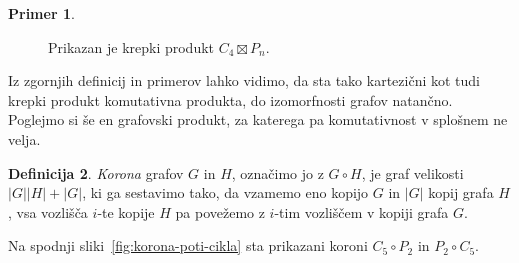 \documentclass[12pt,a4paper,twoside]{article}
\theoremstyle{definition} %
\newtheorem{definicija}{Definicija}[section]
\newtheorem{primer}[definicija]{Primer}
\theoremstyle{plain} %
\numberwithin{equation}{section}  %
\begin{document}
\begin{primer}
\begin{figure}[h]
        \caption{Prikazan je krepki produkt $C_4 \boxtimes P_n$.}
        \label{fig:krep-produkt-cikel-pot}
    \end{figure}
\end{primer}

Iz zgornjih definicij in primerov lahko vidimo, da sta tako kartezični kot tudi krepki produkt komutativna produkta, do izomorfnosti grafov natančno. Poglejmo si še en grafovski produkt, za katerega pa komutativnost v splošnem ne velja.

\begin{definicija}
    \emph{Korona} grafov $G$ in $H$, označimo jo z $G \circ H$, je graf velikosti $|G||H| + |G|$, ki ga sestavimo tako, da vzamemo eno kopijo $G$ in $|G|$ kopij grafa $H$, vsa vozlišča $i$-te kopije $H$ pa povežemo z $i$-tim vozliščem v kopiji grafa $G$.
\end{definicija}
Na spodnji sliki~\ref{fig:korona-poti-cikla} sta prikazani koroni $C_5 \circ P_2$ in $P_2 \circ C_5$.
\end{document}
